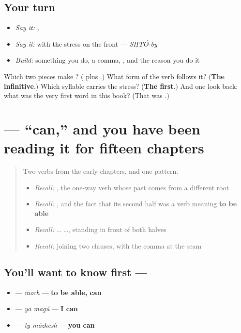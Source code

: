 \subsection*{Your turn}
\begin{itemize}
\raggedright
  \item \emph{Say it:} \emph{ ,  }
  \item \emph{Say it:} \emph{} with the stress on the front — \emph{SHTÓ-by}
  \item \emph{Build:} something you do, a comma, \textbf{}, and the reason you do it
\end{itemize}

\begin{tcolorbox}[breakable,colback=teal!4,colframe=teal!35!black,title={Before you move on}]
Which two pieces make \textbf{}? (\textbf{} plus \textbf{}.) What form of the verb follows it? (\textbf{The infinitive}.) Which syllable carries the stress? (\textbf{The first}.) And one look back: what was the very first word in this book? (That was \textbf{}.)
\end{tcolorbox}
\section[\texorpdfstring{\ru{мочь} (moch)}{мочь (moch)}]{ — \textquotedblleft{}can,\textquotedblright{} and you have been reading it for fifteen chapters}

\label{lesson:RU-C20-moch}



\begin{quote}
Two verbs from the early chapters, and one pattern.

\begin{itemize}
\raggedright
  \item \emph{Recall:} \emph{}, the one-way verb whose past comes from a different root
  \item \emph{Recall:} \emph{}, and the fact that its second half was a verb meaning \textbf{to be able}
  \item \emph{Recall:} \emph{ …  …}, standing in front of both halves
  \item \emph{Recall:} \emph{} joining two clauses, with the comma at the seam
\end{itemize}
\end{quote}

\subsection*{You'll want to know first — }
\begin{itemize}
\raggedright
  \item \textbf{} — \emph{moch} — \textbf{to be able, can}
  \item \textbf{ } — \emph{ya magú} — \textbf{I can}
  \item \textbf{ } — \emph{ty mózhesh} — \textbf{you can}
\end{itemize}

